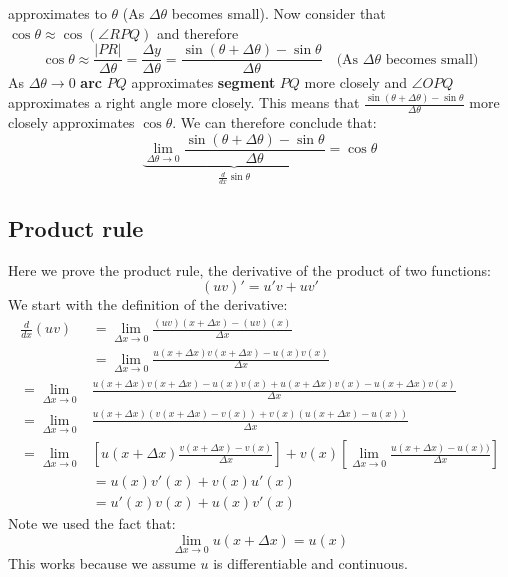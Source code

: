 \documentclass{report}
\begin{document}
approximates to $\theta$ (As $\Delta\theta$ becomes small). Now consider that
$\cos\theta\approx\cos(\angle RPQ)$ and therefore
\begin{equation*}
\cos\theta\approx\frac{|PR|}{\Delta\theta}=\frac{\Delta y}{\Delta\theta}
=\frac{\sin(\theta+\Delta\theta)-\sin\theta}{\Delta\theta}\quad
\text{(As $\Delta\theta$ becomes small)}
\end{equation*}
As $\Delta\theta\to0$ \textbf{arc} $PQ$ approximates \textbf{segment} $PQ$ more closely and 
$\angle OPQ$ approximates a right angle more closely. This means that
$\frac{\sin(\theta+\Delta\theta)-\sin\theta}{\Delta\theta}$ more closely approximates 
$\cos\theta$. We can therefore conclude that:
\begin{equation*}
\underbrace{\lim_{\Delta\theta\to0}\frac{\sin(\theta+\Delta\theta)-\sin\theta}
{\Delta\theta}}_{\frac{d}{dx}\sin\theta}=\cos\theta
\end{equation*}
\newpage

\subsection{Product rule} %
Here we prove the product rule, the derivative of the product of two functions:
\begin{equation*}
(uv)'=u'v+uv'
\end{equation*}
We start with the definition of the derivative:
\begin{align*}
\frac{d}{dx}(uv)&=\lim_{\Delta x\to0}\frac{(uv)(x+\Delta x)-(uv)(x)}{\Delta x}\\
&=\lim_{\Delta x\to0}\frac{u(x+\Delta x)v(x+\Delta x)-u(x)v(x)}{\Delta x}\\
=\lim_{\Delta x\to0}&\frac{u(x+\Delta x)v(x+\Delta x)-u(x)v(x)
+u(x+\Delta x)v(x)-u(x+\Delta x)v(x)}{\Delta x}\\
=\lim_{\Delta x\to0}&\frac{u(x+\Delta x)(v(x+\Delta x)-v(x))
+v(x)(u(x+\Delta x)-u(x))}{\Delta x}\\
=\lim_{\Delta x\to0}&\left[u(x+\Delta x)\frac{v(x+\Delta x)-v(x)}{\Delta x}\right]
+v(x)\left[\lim_{\Delta x\to0}\frac{u(x+\Delta x)-u(x))}{\Delta x}\right]\\
&=u(x)v'(x)+v(x)u'(x)\\
&=u'(x)v(x)+u(x)v'(x)
\end{align*}
Note we used the fact that:
\begin{equation*}
\lim_{\Delta x\to0}u(x+\Delta x)=u(x)
\end{equation*}
This works because we assume $u$ is differentiable and continuous.
\newpage
\end{document}
